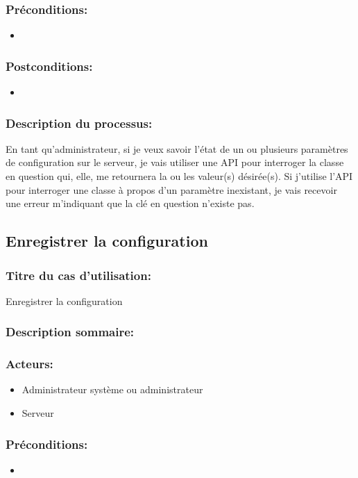 \documentclass{scrreprt}
\begin{document}
\subsubsection{Préconditions:}
\begin{itemize}
    \item  
\end{itemize} 
\subsubsection{Postconditions:}
\begin{itemize}
    \item  
\end{itemize} 
\subsubsection{Description du processus:}En tant qu'administrateur, si je veux savoir l'état de un ou plusieurs paramètres de
configuration sur le serveur, je vais utiliser une API pour interroger la
classe en question qui, elle, me retournera la ou les valeur(s) désirée(s).
Si j'utilise l'API pour interroger une classe à propos d'un paramètre
inexistant, je vais recevoir une erreur m'indiquant que la clé en question
n'existe pas.

\subsection{Enregistrer la configuration}
\subsubsection{Titre du cas d'utilisation:} Enregistrer la configuration
\subsubsection{Description sommaire:}
\subsubsection{Acteurs:}
\begin{itemize}
	\item Administrateur système ou administrateur
    \item Serveur
\end{itemize}
\subsubsection{Préconditions:}
\begin{itemize}
    \item  
\end{itemize} 
\end{document}
